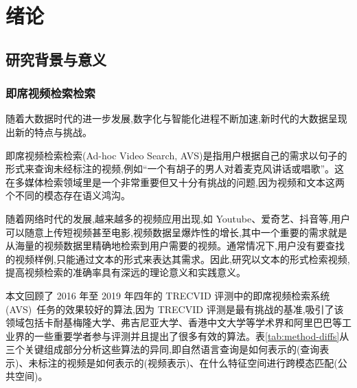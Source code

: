 \chapter{绪论}

\section{研究背景与意义}
\subsection{即席视频检索检索}
随着大数据时代的进一步发展,数字化与智能化进程不断加速,新时代的大数据呈现出新的特点与挑战。

即席视频检索检索(Ad-hoc Video Search, AVS)是指用户根据自己的需求以句子的形式来查询未经标注的视频,例如“一个有胡子的男人对着麦克风讲话或唱歌”。这在多媒体检索领域里是一个非常重要但又十分有挑战的问题,因为视频和文本这两个不同的模态存在语义鸿沟。

随着网络时代的发展,越来越多的视频应用出现,如 Youtube、爱奇艺、抖音等,用户可以随意上传短视频甚至电影,视频数据呈爆炸性的增长,其中一个重要的需求就是从海量的视频数据里精确地检索到用户需要的视频。通常情况下,用户没有要查找的视频样例,只能通过文本的形式来表达其需求。因此,研究以文本的形式检索视频,提高视频检索的准确率具有深远的理论意义和实践意义。

本文回顾了 2016 年至 2019 年四年的 TRECVID 评测中的即席视频检索系统(AVS)~\cite{awad2016trecvid,awad2017trecvid,awad2018trecvid,awad2019trecvid}任务的效果较好的算法,因为 TRECVID 评测是最有挑战的基准,吸引了该领域包括卡耐基梅隆大学、弗吉尼亚大学、香港中文大学等学术界和阿里巴巴等工业界的一些重要学者参与评测并且提出了很多有效的算法。表\ref{tab:method-diffs}从三个关键组成部分分析这些算法的异同,即自然语言查询是如何表示的(查询表示)、未标注的视频是如何表示的(视频表示)、在什么特征空间进行跨模态匹配(公共空间)。


